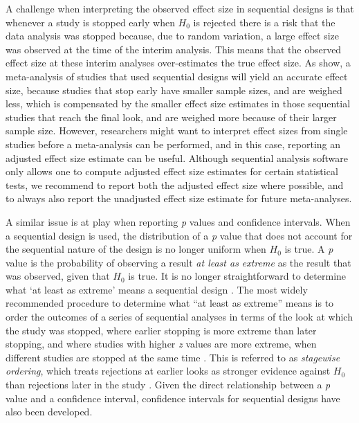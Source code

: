 \documentclass[
  oneside]{book}
\begin{document}
A challenge when interpreting the observed effect size in sequential designs is that whenever a study is stopped early when \(H_0\) is rejected there is a risk that the data analysis was stopped because, due to random variation, a large effect size was observed at the time of the interim analysis. This means that the observed effect size at these interim analyses over-estimates the true effect size. As \citet{schonbrodt_sequential_2017} show, a meta-analysis of studies that used sequential designs will yield an accurate effect size, because studies that stop early have smaller sample sizes, and are weighed less, which is compensated by the smaller effect size estimates in those sequential studies that reach the final look, and are weighed more because of their larger sample size. However, researchers might want to interpret effect sizes from single studies before a meta-analysis can be performed, and in this case, reporting an adjusted effect size estimate can be useful. Although sequential analysis software only allows one to compute adjusted effect size estimates for certain statistical tests, we recommend to report both the adjusted effect size where possible, and to always also report the unadjusted effect size estimate for future meta-analyses.

A similar issue is at play when reporting \emph{p} values and confidence intervals. When a sequential design is used, the distribution of a \emph{p} value that does not account for the sequential nature of the design is no longer uniform when \(H_0\) is true. A \emph{p} value is the probability of observing a result \emph{at least as extreme} as the result that was observed, given that \(H_0\) is true. It is no longer straightforward to determine what `at least as extreme' means a sequential design \citep{cook_p-value_2002}. The most widely recommended procedure to determine what ``at least as extreme'' means is to order the outcomes of a series of sequential analyses in terms of the look at which the study was stopped, where earlier stopping is more extreme than later stopping, and where studies with higher \emph{z} values are more extreme, when different studies are stopped at the same time \citep{proschan_statistical_2006}. This is referred to as \emph{stagewise ordering}, which treats rejections at earlier looks as stronger evidence against \(H_0\) than rejections later in the study \citep{wassmer_group_2016}. Given the direct relationship between a \emph{p} value and a confidence interval, confidence intervals for sequential designs have also been developed.
\end{document}
